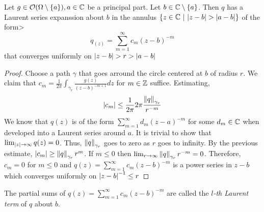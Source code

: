 \begin{lema}
    Let $g \in \mathcal{O} (\Omega \setminus \left\{a\right\}), a \in \mathbb{C}$ be a principal part. Let $b \in \mathbb{C} \setminus \left\{a\right\}$. Then $q$ has a Laurent series expanssion about $b$ in the annulus $\left\{z \in \mathbb{C} ~\middle\vert~\left\lvert z - b\right\rvert > \left\lvert a - b\right\rvert\right\}$ of the form>
    $$
        q_(z) = \sum_{m = 1}^{\infty} c_m (z - b)^{-m}
    $$
    that converges uniformly on $\left\lvert z - b\right\rvert > r > \left\lvert a - b\right\rvert$
\end{lema}
\begin{proof}
    Choose a path $\gamma$ that goes arround the circle centered at $b$ of radius $r$. We claim that $c_m = \frac{1}{2 \pi} \int_{\gamma_r} \frac{g(z)}{(z - b)^{-m + 1}} dz$ for $m \in \mathbb{Z}$ suffice.
    Estimating,
    $$
        \left\lvert c_m\right\rvert \leq \frac{1}{ 2 \pi} 2 \pi \frac{\left\lVert q\right\rVert_{\gamma_r}}{r^{- m}}
    $$
    We know that $q(z)$ is of the form $\sum_{m = 1}^{\infty} d_m (z - a)^{-m}$ for some $d_m \in \mathbb{C}$ when developed into a Laurent series around $a$. It is trivial to show that $\lim_{\left\lvert z\right\rvert\rightarrow \infty}q(z) = 0$. Thus, $\left\lVert q\right\rVert_{\gamma_r}$ goes to zero as $r$ goes to infinity. By the previous estimate, $\left\lvert c_m\right\rvert \geq \left\lVert q\right\rVert_{\gamma_r} r^{ m}$. If $m \leq 0$ then $\lim_{r \rightarrow \infty} \left\lVert q\right\rVert_{\gamma_r} r^{- m} = 0$. Therefore, $c_m = 0$ for $m \leq 0$ and $q(z) = \sum_{m = 1}^{\infty} c_m (z - b)^{ - m}$ is a power series in $z - b$ which converges uniformly on $\left\lvert z - b\right\rvert^{-1} \leq r$
\end{proof}
\begin{definicija}
    The partial sums of $q(z) = \sum_{m = 1}^{\infty} c_m (z - b)^{ - m}$ are called the \textit{$l$-th Laurent term} of $q$ about $b$.
\end{definicija}


